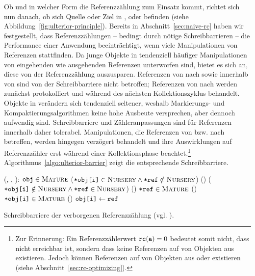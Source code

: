Ob und in welcher Form die Referenzzählung zum Einsatz kommt, richtet sich nun danach, ob sich Quelle oder Ziel in \Roots, \Nursery oder \Mature befinden (siehe Abbildung~\ref{fig:ulterior-principle}).
Bereits in Abschnitt~\ref{sec:naive-rc} haben wir festgestellt, dass Referenzzählungen -- bedingt durch nötige Schreibbarrieren -- die Performance einer Anwendung beeinträchtigt, wenn viele Manipulationen von Referenzen stattfinden.
Da junge Objekte in \Nursery tendenziell häufiger Manipulationen von eingehenden wie ausgehenden Referenzen unterworfen sind, bietet es sich an, diese von der Referenzzählung auszusparen.
Referenzen von \Roots nach \Nursery sowie innerhalb von \Nursery sind von der Schreibbarriere nicht betroffen; Referenzen von \Mature nach \Nursery werden zunächst protokolliert und während des nächsten Kollektionszyklus behandelt.
Objekte in \Mature verändern sich tendenziell seltener, weshalb Markierungs- und Kompaktierungsalgorithmen keine hohe Ausbeute versprechen, aber dennoch aufwendig sind.
Schreibbarriere und Zähleranpassungen sind für Referenzen innerhalb \Mature daher tolerabel.
Manipulationen, die Referenzen von \Roots bzw. \Nursery nach \Mature betreffen, werden hingegen verzögert behandelt und ihre Auswirklungen auf Referenzzähler erst während einer Kollektionsphase beachtet.\footnote{Zur Erinnerung: Ein Referenzzählerwert $\texttt{rc}(\texttt{a}) = 0$ bedeutet somit nicht, dass  nicht erreichbar ist, sondern dass keine Referenzen auf  von Objekten aus \Mature existieren. Jedoch können Referenzen auf  von Objekten aus \Roots oder \Nursery existieren (siehe Abschnitt~\ref{sec:rc-optimizing}).}
Algorithmus~\ref{algo:ulterior-barrier} zeigt die entsprechende Schreibbarriere.

\begin{algorithm}[h]
\begin{algorithmic}[1]
	\State {}(, , ):
	\State \quad \IF $\texttt{obj} \in \textsc{Mature}$
	\State \quad \quad \Atomic
	\State \quad \quad \quad \IF ($\texttt{*obj[i]} \in \textsc{Nursery} \wedge \texttt{*ref} \notin \textsc{Nursery}$)	
	\State \quad \quad \quad \quad {}()	
	\State \quad \quad \quad \ELSE \IF ($\texttt{*obj[i]} \notin \textsc{Nursery} \wedge \texttt{*ref} \in \textsc{Nursery}$)
	\State \quad \quad \quad \quad {}()	
	\State \quad \quad \quad \IF $\texttt{*ref} \in \textsc{Mature}$		
	\State \quad \quad \quad \quad {}()
	\State \quad \quad \quad \IF $\texttt{*obj[i]} \in \textsc{Mature}$
	\State \quad \quad \quad \quad {}()
	\State \quad $\texttt{obj[i]} \gets \texttt{ref}$
\end{algorithmic}
\caption[Schreibbarriere der verborgenen Referenzzählung]{Schreibbarriere der verborgenen Referenzzählung (vgl. \cite[S. 346ff]{blackburn2003}).}
\label{algo:ulterior-barrier}
\end{algorithm}



